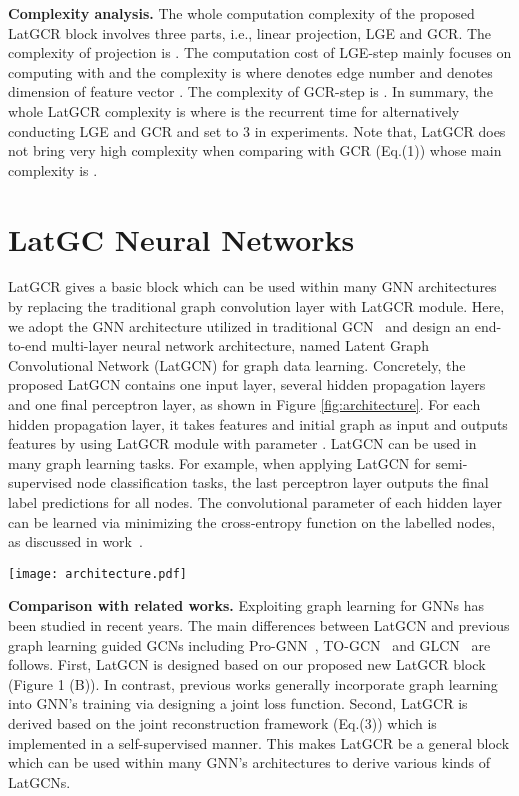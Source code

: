 \documentclass{article}
\begin{document}
\textbf{Complexity analysis.}
The whole computation complexity of the proposed LatGCR block involves three parts, i.e., linear projection, LGE and GCR.
The complexity of projection  is .
The computation cost of LGE-step mainly focuses on  computing  with   and
the complexity is  where  denotes edge number and  denotes dimension of feature vector .
The complexity of GCR-step is .
In summary, the whole LatGCR complexity is
 where  is the recurrent time for alternatively conducting LGE and GCR and set to 3 in experiments.
Note that, LatGCR does not bring very high complexity when comparing with GCR (Eq.(1)) whose main complexity is .



\section{LatGC Neural Networks}


LatGCR gives a basic block which can be used within many GNN architectures~\cite{DGI,graphsage,kipf2016semi} by replacing the traditional graph convolution layer with LatGCR module.
Here, we adopt the GNN architecture utilized in traditional GCN~\cite{kipf2016semi} and design an end-to-end multi-layer neural network architecture, named Latent Graph Convolutional Network (LatGCN) for graph data learning.
Concretely, the proposed LatGCN contains one input layer, several hidden propagation layers and one final perceptron layer, as shown in Figure \ref{fig:architecture}.
 For each hidden propagation layer, it takes features  and initial graph  as input and outputs features  by using LatGCR module with  parameter .
LatGCN can be used in many graph learning tasks.
For example, when applying LatGCN for semi-supervised node classification tasks, the last perceptron layer outputs the final label predictions  for all nodes.
 The convolutional parameter  of each hidden layer can be learned via minimizing  the cross-entropy function on the labelled nodes, as discussed in work~\cite{kipf2016semi}.

\begin{figure*}[ht]
\centering
\texttt{[image: architecture.pdf]}
  \caption{The architecture of LatGCN.}\label{fig:architecture}
\end{figure*}



\textbf{Comparison with related works.}
Exploiting graph learning for GNNs has been studied in recent years.
The main differences between LatGCN and previous graph learning guided GCNs including Pro-GNN~\cite{prognn}, TO-GCN~\cite{TOGCN} and GLCN~\cite{GLCN} are follows.
First, LatGCN is designed based on our proposed new LatGCR block (Figure 1 (B)).
In contrast, previous works generally incorporate graph learning into GNN's training via designing a joint loss function.
Second, LatGCR is derived based on the joint reconstruction framework (Eq.(3)) which is implemented in a self-supervised manner. This makes LatGCR be a general block which can be used within many GNN's architectures to derive various kinds of LatGCNs.
\end{document}
